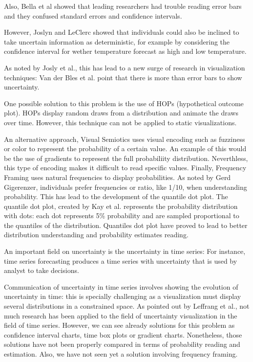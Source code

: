 \documentclass[a4paper,3p,sort&compress]{elsarticle}
\begin{document}
Also, Bella et al showed that leading researchers had trouble reading error bars and they confused 
standard errors and confidence intervals. 

However, Joslyn and LeClerc showed that individuals could also be inclined to take uncertain 
information as deterministic, for example by considering the confidence interval for wether temperature 
forecast as high and low temperature.

As noted by Josly et al., this has lead to a new surge of research in visualization techniques: Van 
der Bles et al. point that there is more than error bars to show uncertainty. 

One possible solution to this problem is the use of HOPs (hypothetical outcome plot). HOPs display 
random draws from a distribution and animate the draws over time. However, this technique can not be 
applied to static visualizations. 

An alternative approach, Visual Semiotics uses visual encoding such as fuzziness or color to represent 
the probability of a certain value. An example of this would be the use of gradients to represent the 
full probabiliity distribution. Neverthless, this type of encoding makes it difficult to read specific 
values. Finally, Frequency Framing uses natural frequencies to display probabilities. As noted by Gerd 
Gigerenzer, individuals prefer frequencies or ratio, like 1/10, when understanding probability. This has 
lead to the development of the quantile dot plot. The quantile dot plot, created by Kay et al. represents 
the probability distribution with dots: each dot represents 5\% probability and are sampled proportional 
to the quantiles of the distribution. Quantiles dot plot have proved to lead to better distribution 
understanding and probability estimates reading.

An important field on uncertainty is the uncertainty in time series: For instance, time series forecasting 
produces a time series with uncertainty that is used by analyst to take decisions.

Communication of uncertainty in time series involves showing the evolution of uncertainty in time: this 
is specially challenging as a visualization must display several distributions in a constrained space.  
As pointed out by Leffrang et al., not much research has been applied to the field of uncertainty visualization 
in the field of time series. However, we can see already solutions for this problem as confidence interval charts,
 time box plots or gradient charts. Nonetheless, those solutions have not been properly compared in terms of 
 probability reading and estimation. Also, we have not seen yet a solution involving frequency framing.
\end{document}
